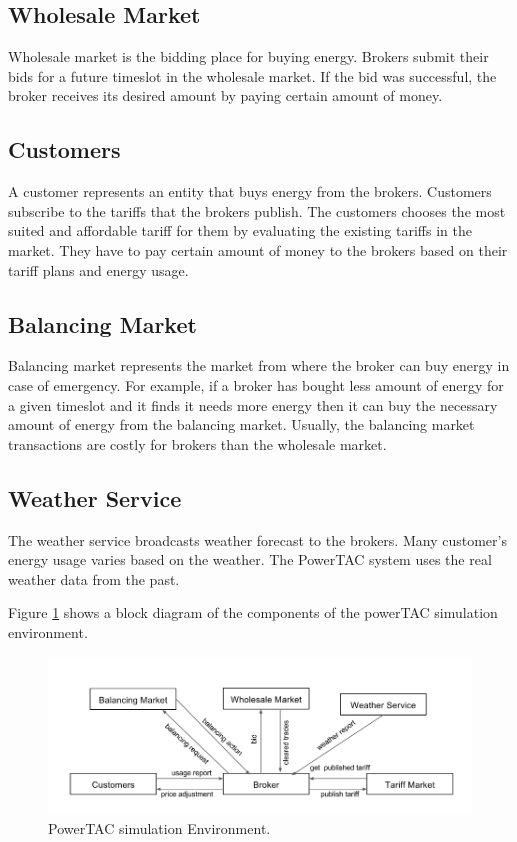\subsection{Wholesale Market}
Wholesale market is the bidding place for buying energy. Brokers submit their bids for a future timeslot in the wholesale market. If the bid was successful, the broker receives its desired amount by paying certain amount of money. 

\subsection{Customers}
A customer represents an entity that buys energy from the brokers. Customers subscribe to the tariffs that the brokers publish. The customers chooses the most suited and affordable tariff for them by evaluating the existing tariffs in the market. They have to pay certain amount of money to the brokers based on their tariff plans and energy usage.

\subsection{Balancing Market}
Balancing market represents the market from where the broker can buy energy in case of emergency. For example, if a broker has bought less amount of energy for a given timeslot and it finds it needs more energy then it can buy the necessary amount of energy from the balancing market. Usually, the balancing market transactions are costly for brokers than the wholesale market.

\subsection{Weather Service}
The weather service broadcasts weather forecast to the brokers. Many customer's energy usage varies based on the weather. The PowerTAC system uses the real weather data from the past.

Figure \ref{fig:simulation-environment}  shows a block diagram of the components of the powerTAC simulation environment.

\begin{figure}[h!]
  \includegraphics[width=\linewidth]{simulation-environment.png}
  \caption{PowerTAC simulation Environment.}
  \label{fig:simulation-environment}
\end{figure}

